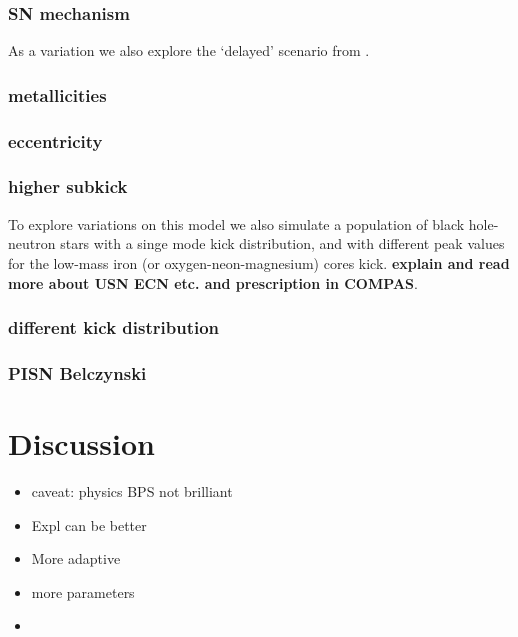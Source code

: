 \documentclass[a4paper,fleqn,usenatbib]{mnras}
\newcommand{\floor}[1]{\textbf{\textcolor{ochre}{#1}}}
\begin{document}
\subsubsection{SN mechanism}
As a variation we also explore the `delayed' scenario from \citep{fryer2012compact}.

\subsubsection{metallicities}

\subsubsection{eccentricity}

\subsubsection{higher subkick}
To explore variations on this model we also simulate a population of black hole-neutron stars with a singe mode kick distribution, and with different peak values for the low-mass iron (or oxygen-neon-magnesium) cores kick. \floor{explain and read more about USN ECN etc. and prescription in COMPAS}.
\subsubsection{different kick distribution}

\subsubsection{PISN Belczynski}






\section{Discussion}
\label{sec:discussion}
%
\begin{itemize}
\item caveat: physics BPS not brilliant
\item Expl can be better
\item More adaptive
\item more parameters
\item 
\end{itemize}
%
\end{document}
